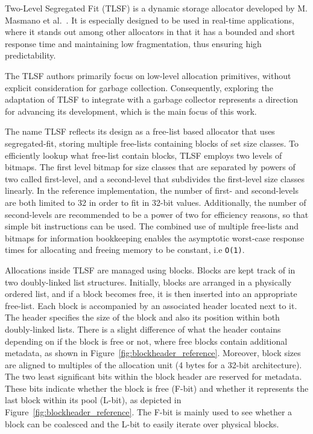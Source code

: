
Two-Level Segregated Fit (TLSF) is a dynamic storage allocator developed by M. Masmano et al.~\cite{TLSF}. It is especially designed to be used in real-time applications, where it stands out among other allocators in that it has a bounded and short response time and maintaining low fragmentation, thus ensuring high predictability. 

The TLSF authors primarily focus on low-level allocation primitives, without explicit consideration for garbage collection. Consequently, exploring the adaptation of TLSF to integrate with a garbage collector represents a direction for advancing its development, which is the main focus of this work.

The name TLSF reflects its design as a free-list based allocator that uses segregated-fit, storing multiple free-lists containing blocks of set size classes. To efficiently lookup what free-list contain blocks, TLSF employs two levels of bitmaps. The first level bitmap for size classes that are separated by powers of two called first-level, and a second-level that subdivides the first-level size classes linearly. In the reference implementation, the number of first- and second-levels are both limited to 32 in order to fit in 32-bit values. Additionally, the number of second-levels are recommended to be a power of two for efficiency reasons, so that simple bit instructions can be used. The combined use of multiple free-lists and bitmaps for information bookkeeping enables the asymptotic worst-case response times for allocating and freeing memory to be constant, i.e \texttt{O(1)}.

Allocations inside TLSF are managed using blocks. Blocks are kept track of in two doubly-linked list structures. Initially, blocks are arranged in a physically ordered list, and if a block becomes free, it is then inserted into an appropriate free-list. Each block is accompanied by an associated header located next to it. The header specifies the size of the block and also its position within both doubly-linked lists. There is a slight difference of what the header contains depending on if the block is free or not, where free blocks contain additional metadata, as shown in Figure~\ref{fig:blockheader_reference}. Moreover, block sizes are aligned to multiples of the allocation unit (4 bytes for a 32-bit architecture). The two least significant bits within the block header are reserved for metadata. These bits indicate whether the block is free (F-bit) and whether it represents the last block within its pool (L-bit), as depicted in Figure~\ref{fig:blockheader_reference}. The F-bit is mainly used to see whether a block can be coalesced and the L-bit to easily iterate over physical blocks.

